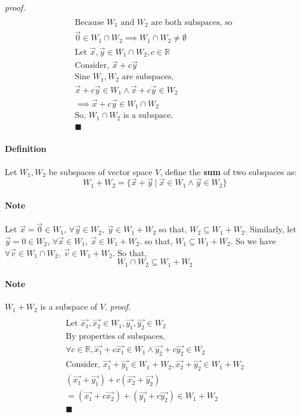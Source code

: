 \documentclass[11pt]{article}
\begin{document}
	\emph{proof.}
	\begin{multline*}
		\\
		\text{Because $W_1$ and $W_2$ are both subspaces, so } \\
		\vec{0} \in W_1 \cap W_2 \implies W_1 \cap W_2 \neq \emptyset \\
		\text{Let } \vec{x}, \vec{y} \in W_1 \cap W_2, c \in \mathbb{R} \\
		\text{Consider, } \vec{x} + c\vec{y} \\
		\text{Sine $W_1, W_2$ are subspaces, } \\
		\vec{x} + c\vec{y} \in W_1 \land \vec{x} + c\vec{y} \in W_2 \\
		\implies \vec{x} + c\vec{y} \in W_1 \cap W_2 \\
		\text{So, }W_1 \cap W_2\text{ is a subspace.} \\
		\blacksquare
	\end{multline*}
	\paragraph{Definition} Let $W_1,W_2$ be subspaces of vector space $V$, define the \textbf{sum} of two subspaces as:
	\[
	W_1 + W_2 = \{\vec{x} + \vec{y}\ \vert\ \vec{x} \in W_1 \land \vec{y} \in W_2\}
	\]
	\paragraph{Note} Let $\vec{x} = \vec{0} \in W_1$, $\forall \vec{y} \in W_2,\ \vec{y} \in W_1 + W_2$ so that, $W_2 \subseteq W_1 + W_2$. Similarly, let $\vec{y} = 0 \in W_2$, $\forall \vec{x} \in W_1,\ \vec{x} \in W_1 + W_2$. so that, $W_1 \subseteq W_1 + W_2$. So we have $\forall \vec{v} \in W_1 \cap W_2,\ \vec{v} \in W_1 + W_2$. So that, 
		\[
		W_1 \cap W_2 \subseteq W_1 + W_2
		\]
	\paragraph{Note} $W_1 + W_2$ is a subspace of $V$.
	\newline
	\emph{proof.}
	\begin{multline*}
		\\
		\text{Let } \vec{x_1}, \vec{x_2} \in W_1, \vec{y_1}, \vec{y_2} \in W_2 \\
		\text{By properties of subspaces, }\\
		\forall c \in \mathbb{R}, \vec{x_1} + c\vec{x_1} \in W_1 \land \vec{y_2} + c\vec{y_2} \in W_2 \\
		\text{Consider, } \vec{x_1} + \vec{y_1} \in W_1 + W_2, \vec{x_2} + \vec{y_2} \in W_1 + W_2 \\
		(\vec{x_1} + \vec{y_1}) + c(\vec{x_2} + \vec{y_2}) \\
		= (\vec{x_1} + c\vec{x_2}) + (\vec{y_1} + c\vec{y_2}) \in W_1 + W_2\\
		\blacksquare
	\end{multline*}
\end{document}
